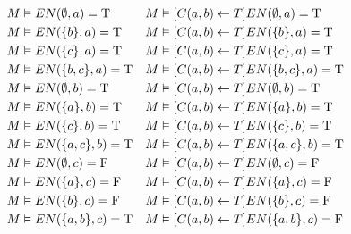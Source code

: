 \begin{frame}
    \begin{align*}
        M & \vDash EN(\emptyset,a)       = \mathrm{T}              &
        M & \vDash[C(a,b)\leftarrow T] EN(\emptyset,a)       = \mathrm{T}   \\
        M & \vDash EN(\{b\},a)    = \mathrm{T}              &
        M & \vDash[C(a,b)\leftarrow T] EN(\{b\},a)    = \mathrm{T}   \\
        M & \vDash EN(\{c\},a)    = \mathrm{T}              &
        M & \vDash[C(a,b)\leftarrow T] EN(\{c\},a)    = \mathrm{T}   \\
        M & \vDash EN(\{b,c\},a)  = \mathrm{T}              &
        M & \vDash[C(a,b)\leftarrow T] EN(\{b,c\},a)  = \mathrm{T}   \\
        M & \vDash EN(\emptyset,b)       = \mathrm{T}              &
        M & \vDash[C(a,b)\leftarrow T] EN(\emptyset,b)       = \mathrm{T}   \\
        M & \vDash EN(\{a\},b)    = \mathrm{T}              &
        M & \vDash[C(a,b)\leftarrow T] EN(\{a\},b)    = \mathrm{T}   \\
        M & \vDash EN(\{c\},b)    = \mathrm{T}              &
        M & \vDash[C(a,b)\leftarrow T] EN(\{c\},b)    = \mathrm{T}   \\
        M & \vDash EN(\{a,c\},b)  = \mathrm{T}              &
        M & \vDash[C(a,b)\leftarrow T] EN(\{a,c\},b)  = \mathrm{T}   \\
        M & \vDash EN(\emptyset,c)       = \mathrm{F}              &
        M & \vDash[C(a,b)\leftarrow T] EN(\emptyset,c)       = \mathrm{F}   \\
        M & \vDash EN(\{a\},c)    = \mathrm{F}              &
        M & \vDash[C(a,b)\leftarrow T] EN(\{a\},c)    = \mathrm{F}   \\
        M & \vDash EN(\{b\},c)    = \mathrm{F}              &
        M & \vDash[C(a,b)\leftarrow T] EN(\{b\},c)    = \mathrm{F}   \\
        M & \vDash EN(\{a,b\},c)  = \mathrm{T}              &
        M & \vDash[C(a,b)\leftarrow T] EN(\{a,b\},c)  = \mathrm{F}   \\
    \end{align*}
\end{frame}
\begin{frame}
    \begin{center}
    \end{center}
\end{frame}